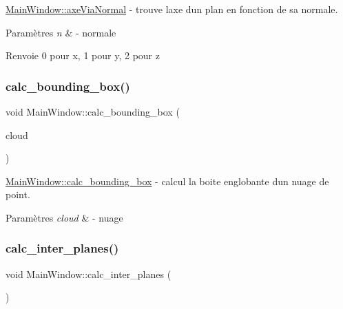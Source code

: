 \hyperlink{classMainWindow_a271a1410c7952fbdb4aa418acd38a52f}{Main\+Window\+::axe\+Via\+Normal} -\/ trouve l\textquotesingle{}axe d\textquotesingle{}un plan en fonction de sa normale. 


\begin{DoxyParams}{Paramètres}
{\em n} & -\/ normale \\
\hline
\end{DoxyParams}
\begin{DoxyReturn}{Renvoie}
0 pour x, 1 pour y, 2 pour z 
\end{DoxyReturn}
\mbox{\label{classMainWindow_a0e33f00b6a6dc0c09dbc75d7396b7094}} 
\subsubsection{\texorpdfstring{calc\+\_\+bounding\+\_\+box()}{calc\_bounding\_box()}}
{\footnotesize\ttfamily void Main\+Window\+::calc\+\_\+bounding\+\_\+box (\begin{DoxyParamCaption}\item[{pcl\+::\+Point\+Cloud$<$ pcl\+::\+Point\+X\+YZ $>$\+::Ptr}]{cloud }\end{DoxyParamCaption})}



\hyperlink{classMainWindow_a0e33f00b6a6dc0c09dbc75d7396b7094}{Main\+Window\+::calc\+\_\+bounding\+\_\+box} -\/ calcul la boite englobante d\textquotesingle{}un nuage de point. 


\begin{DoxyParams}{Paramètres}
{\em cloud} & -\/ nuage \\
\hline
\end{DoxyParams}
\mbox{\label{classMainWindow_a94ae96c49d6c349e19632d9639926029}} 
\subsubsection{\texorpdfstring{calc\+\_\+inter\+\_\+planes()}{calc\_inter\_planes()}}
{\footnotesize\ttfamily void Main\+Window\+::calc\+\_\+inter\+\_\+planes (\begin{DoxyParamCaption}{ }\end{DoxyParamCaption})}



